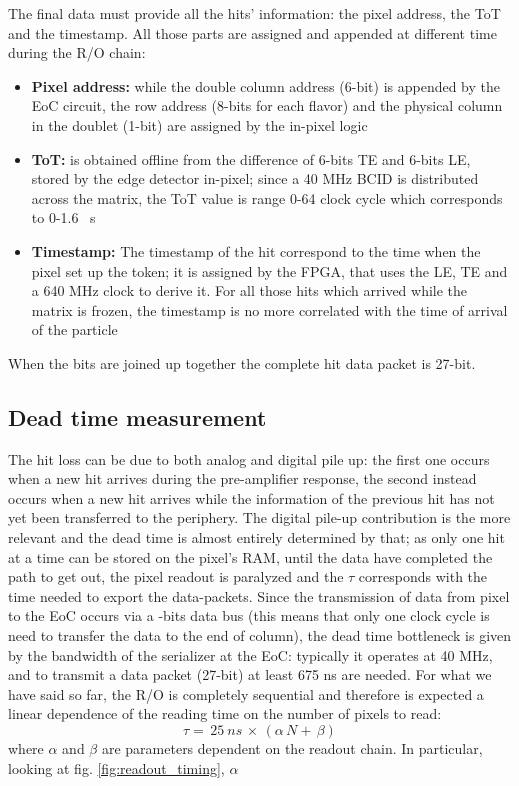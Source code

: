     
    The final data must provide all the hits' information: the pixel address, the ToT and the timestamp. All those parts are assigned and appended at different time during the R/O chain:  
    \begin{itemize}
        \item\textbf{Pixel address:} while the double column address (6-bit) is appended by the EoC circuit, the row address (8-bits for each flavor) and the physical column in the doublet (1-bit) are assigned by the in-pixel logic      
        \item \textbf{ToT:} is obtained offline from the difference of 6-bits TE and 6-bits LE, stored by the edge detector in-pixel; since a 40 MHz BCID is distributed across the matrix, the ToT value is range 0-64 clock cycle which corresponds to 0-1.6 \si{\mu s}  
        \item \textbf{Timestamp:} The timestamp of the hit correspond to the time when the pixel set up the token; it is assigned by the FPGA, that uses the LE, TE and a 640 MHz clock to derive it. For all those hits which arrived while the matrix is frozen, the timestamp is no more correlated with the time of arrival of the particle         
    \end{itemize}
    When the bits are joined up together the complete hit data packet is 27-bit. 

    \subsection{Dead time measurement}
        The hit loss can be due to both analog and digital pile up: the first one occurs when a new hit arrives during the pre-amplifier response, the second instead occurs when a new hit arrives while the information of the previous hit has not yet been transferred to the periphery. 
        The digital pile-up contribution is the more relevant and the dead time is almost entirely determined by that; as only one hit at a time can be stored on the pixel's RAM, until the data have completed the path to get out, the pixel readout is paralyzed and the $\tau$ corresponds with the time needed to export the data-packets.
        Since the transmission of data from pixel to the EoC occurs via a -bits data bus (this means that only one clock cycle is need to transfer the data to the end of column), the dead time bottleneck is given by the bandwidth of the serializer at the EoC: typically it operates at 40 MHz, and to transmit a data packet (27-bit) at least 675 \si{ns} are needed. 
        For what we have said so far, the R/O is completely sequential and therefore is expected a linear dependence of the reading time on the number of pixels to read:
        \begin{equation}
            \tau =\, 25\: \unit{ns}\, \times\, (\alpha\, N +\, \beta)
        \end{equation}
        where $\alpha$ and $\beta$ are parameters dependent on the readout chain. 
        In particular, looking at fig. \ref{fig:readout_timing}, $\alpha$ 

